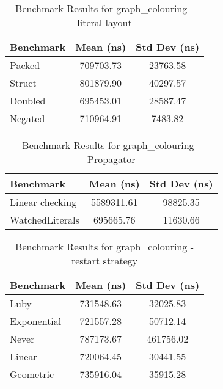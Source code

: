 \begin{table}[h]
    \centering
    \caption{Benchmark Results for graph_colouring - literal layout}
    \begin{tabular}{|l|c|c|}
        \hline
        Benchmark & Mean (ns) & Std Dev (ns) \\
        \hline
        Packed & 709703.73 & 23763.58 \\
        Struct & 801879.90 & 40297.57 \\
        Doubled & 695453.01 & 28587.47 \\
        Negated & 710964.91 & 7483.82 \\
        \hline
    \end{tabular}
\end{table}


\begin{table}[h]
    \centering
    \caption{Benchmark Results for graph_colouring - Propagator}
    \begin{tabular}{|l|c|c|}
        \hline
        Benchmark & Mean (ns) & Std Dev (ns) \\
        \hline
        Linear checking & 5589311.61 & 98825.35 \\
        WatchedLiterals & 695665.76 & 11630.66 \\
        \hline
    \end{tabular}
\end{table}


\begin{table}[h]
    \centering
    \caption{Benchmark Results for graph_colouring - restart strategy}
    \begin{tabular}{|l|c|c|}
        \hline
        Benchmark & Mean (ns) & Std Dev (ns) \\
        \hline
        Luby & 731548.63 & 32025.83 \\
        Exponential & 721557.28 & 50712.14 \\
        Never & 787173.67 & 461756.02 \\
        Linear & 720064.45 & 30441.55 \\
        Geometric & 735916.04 & 35915.28 \\
        \hline
    \end{tabular}
\end{table}

